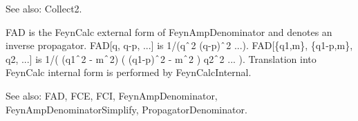 

See also:  Collect2.

















FAD is the FeynCalc external form of FeynAmpDenominator and denotes an inverse propagator. FAD[q, q-p, ...] is 1/(q\(\RawWedge\)2
  (q-p)\(\RawWedge\)2 ...). FAD[\{q1,m\}, \{q1-p,m\}, q2, ...] is 1/( (q1\(\RawWedge\)2 - m\(\RawWedge\)2) ( (q1-p)\(\RawWedge\)2 -
  m\(\RawWedge\)2 ) q2\(\RawWedge\)2 ... ). Translation into FeynCalc internal form is performed by FeynCalcInternal.

See also:  FAD, FCE, FCI, FeynAmpDenominator, FeynAmpDenominatorSimplify, PropagatorDenominator.




